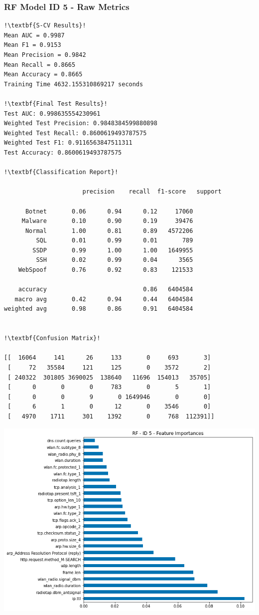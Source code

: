 \begin{appendices}
\newpage
\subsubsection{RF Model ID 5 - Raw Metrics}
\begin{lstlisting}[escapechar=!]
!\textbf{S-CV Results}!
Mean AUC = 0.9987
Mean F1 = 0.9153
Mean Precision = 0.9842
Mean Recall = 0.8665
Mean Accuracy = 0.8665
Training Time 4632.155310869217 seconds

!\textbf{Final Test Results}!
Test AUC: 0.998635554230961
Weighted Test Precision: 0.9848384599880898
Weighted Test Recall: 0.8600619493787575
Weighted Test F1: 0.9116563847511311
Test Accuracy: 0.8600619493787575

!\textbf{Classification Report}!

			          precision    recall  f1-score   support

      Botnet       0.06      0.94      0.12     17060
     Malware       0.10      0.90      0.19     39476
      Normal       1.00      0.81      0.89   4572206
         SQL       0.01      0.99      0.01       789
        SSDP       0.99      1.00      1.00   1649955
         SSH       0.02      0.99      0.04      3565
    WebSpoof       0.76      0.92      0.83    121533

    accuracy                           0.86   6404584
   macro avg       0.42      0.94      0.44   6404584
weighted avg       0.98      0.86      0.91   6404584
    
    
!\textbf{Confusion Matrix}!

[[  16064     141      26     133       0     693       3]
 [     72   35584     121     125       0    3572       2]
 [ 240322  301805 3690025  138640   11696  154013   35705]
 [      0       0       0     783       0       5       1]
 [      0       0       9       0 1649946       0       0]
 [      6       1       0      12       0    3546       0]
 [   4970    1711     301    1392       0     768  112391]]
\end{lstlisting}

\begin{center}
	\centering
	\includegraphics[width=\textwidth]{Appendices/Images/RF/Model5/RF_Model5_FI.png}
\end{center}



\end{appendices}
